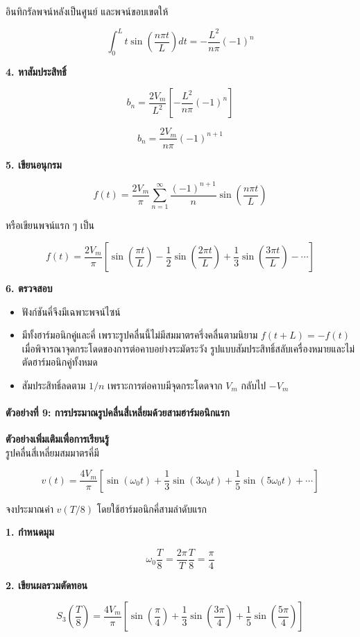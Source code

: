 อินทิกรัลพจน์หลังเป็นศูนย์ และพจน์ขอบเขตให้

\[
\int_0^L t\sin\left(\frac{n\pi t}{L}\right)dt
=-\frac{L^2}{n\pi}(-1)^n
\]

\textbf{4. หาสัมประสิทธิ์}

\[
b_n=\frac{2V_m}{L^2}\left[-\frac{L^2}{n\pi}(-1)^n\right]
\]

\[
b_n=\frac{2V_m}{n\pi}(-1)^{n+1}
\]

\textbf{5. เขียนอนุกรม}

\[
f(t)=\frac{2V_m}{\pi}\sum_{n=1}^{\infty}\frac{(-1)^{n+1}}{n}
\sin\left(\frac{n\pi t}{L}\right)
\]

หรือเขียนพจน์แรก ๆ เป็น

\[
f(t)=\frac{2V_m}{\pi}\left[
\sin\left(\frac{\pi t}{L}\right)
-\frac{1}{2}\sin\left(\frac{2\pi t}{L}\right)
+\frac{1}{3}\sin\left(\frac{3\pi t}{L}\right)
-\cdots
\right]
\]

\textbf{6. ตรวจสอบ}

\begin{itemize}
\item
  ฟังก์ชันคี่จึงมีเฉพาะพจน์ไซน์
\item
  มีทั้งฮาร์มอนิกคู่และคี่ เพราะรูปคลื่นนี้ไม่มีสมมาตรครึ่งคลื่นตามนิยาม \(f(t+L)=-f(t)\) เมื่อพิจารณาจุดกระโดดของการต่อคาบอย่างระมัดระวัง รูปแบบสัมประสิทธิ์สลับเครื่องหมายและไม่ตัดฮาร์มอนิกคู่ทั้งหมด
\item
  สัมประสิทธิ์ลดตาม \(1/n\) เพราะการต่อคาบมีจุดกระโดดจาก \(V_m\) กลับไป \(-V_m\)
\end{itemize}

\paragraph{ตัวอย่างที่ 9: การประมาณรูปคลื่นสี่เหลี่ยมด้วยสามฮาร์มอนิกแรก}

\textbf{ตัวอย่างเพิ่มเติมเพื่อการเรียนรู้}\\
รูปคลื่นสี่เหลี่ยมสมมาตรคี่มี

\[
v(t)=\frac{4V_m}{\pi}\left[\sin(\omega_0t)+\frac{1}{3}\sin(3\omega_0t)+\frac{1}{5}\sin(5\omega_0t)+\cdots\right]
\]

จงประมาณค่า \(v(T/8)\) โดยใช้ฮาร์มอนิกคี่สามลำดับแรก

\textbf{1. กำหนดมุม}

\[
\omega_0\frac{T}{8}=\frac{2\pi}{T}\frac{T}{8}=\frac{\pi}{4}
\]

\textbf{2. เขียนผลรวมตัดทอน}

\[
S_3\left(\frac{T}{8}\right)
=\frac{4V_m}{\pi}\left[
\sin\left(\frac{\pi}{4}\right)
+\frac{1}{3}\sin\left(\frac{3\pi}{4}\right)
+\frac{1}{5}\sin\left(\frac{5\pi}{4}\right)
\right]
\]


